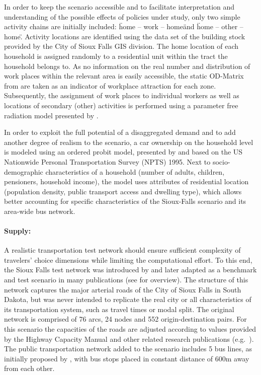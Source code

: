 In order to keep the scenario accessible and to facilitate interpretation and understanding of the possible effects of policies under study, only two simple activity chains are initially included: \"home – work – home\" and \"home – other – home\". Activity locations are identified using the data set of the building stock provided by the City of Sioux Falls GIS division. The home location of each household is assigned randomly to a residential unit within the tract the household belongs to. As no information on the real number and distribution of work places within the relevant area is easily accessible, the static OD-Matrix from \citet[][]{LeBlancEtAl_TransRes_1975} are taken as an indicator of workplace attraction for each zone. Subsequently, the assignment of work places to individual workers as well as locations of secondary (other) activities is performed using a parameter free radiation model presented by \citet[][]{SiminiEtAl_NAT_2012}.

In order to exploit the full potential of a disaggregated demand and to add another degree of realism to the scenario, a car ownership on the household level is modeled using an ordered probit model, presented by \citet[][]{GiulianoDargay_TransResA_2006} and based on the US Nationwide Personal Transportation Survey (NPTS) 1995. Next to socio-demographic characteristics of a household (number of adults, children, pensioners, household income), the model uses attributes of residential location (population density, public transport access and dwelling type), which allows better accounting for specific characteristics of the Sioux-Falls scenario and its area-wide bus network. 

\paragraph{Supply:} 

A realistic transportation test network should ensure sufficient complexity of travelers’ choice dimensions while limiting the computational effort. To this end, the Sioux Falls test network was introduced by \citet[][]{MorlokEtAl_ResRep_org-fhwa_1973} and later adapted as a benchmark and test scenario in many publications (see \citet[][]{ChakirovFourie_TechRep_FCL_2014} for overview). The structure of this network captures the major arterial roads of the City of Sioux Falls in South Dakota, but was never intended to replicate the real city or all characteristics of its transportation system, such as travel times or modal split. The original network is comprised of 76 arcs, 24 nodes and 552 origin-destination pairs. For this scenario the capacities of the roads are adjusted according to values provided by the Highway Capacity Manual \citet[][]{HCM_2010} and other related research publications (e.g.\ \citet[][]{NgCFSmall_Transportation_2012}). The public transportation network added to the scenario includes 5 bus lines, as initially proposed by \citet[][]{AbdulaalLeBlanc_TransScience_1979}, with bus stops placed in constant distance of 600m away from each other. 

